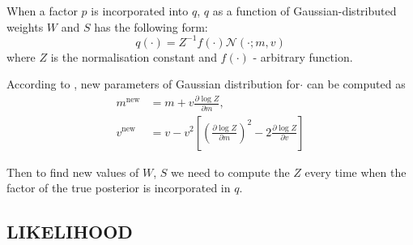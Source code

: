 \documentclass[letterpaper]{article}
\begin{document}
When a factor $p$ is incorporated into $q$, $q$ as a function of Gaussian-distributed weights $W$  and $S$ has the following form:
\begin{equation}
q(\cdot) = Z^{-1}f(\cdot)\mathcal{N}(\cdot; m, v)
\end{equation}
where $Z$ is the normalisation constant and $f(\cdot)$ - arbitrary function. 

According to \cite{minka2001thesis}, new parameters of Gaussian distribution for$ \cdot$ can be computed as
\begin{align}
m^{\text{new}} &= m + v \frac{\partial \log Z}{\partial m}, \\
v^{\text{new}} &= v - v^2\left[ \left(\frac{\partial \log Z}{\partial m}\right)^2 - 2 \frac{\partial \log Z}{\partial v}\right]
\end{align}

Then to find new values of $W$, $S$ we need to compute the $Z$ every time when the factor of the true posterior is incorporated in $q$.

\subsection{\uppercase{Likelihood}}
\end{document}

